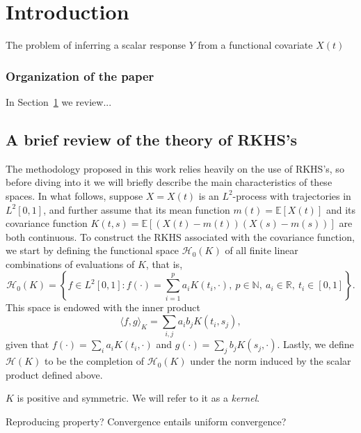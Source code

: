 \documentclass[ba]{imsart}
\numberwithin{equation}{section}
\theoremstyle{plain}
\newcommand{\N}{\mathbb{N}}
\newcommand{\R}{\mathbb{R}}
\newenvironment{comment}
{
\noindent \em \color{red}
}
{
\color{black}
}
\begin{document}
\section{Introduction}\label{sec:intro}

The problem of inferring a scalar response \(Y\) from a functional covariate \(X(t)\)

\subsubsection{Organization of the paper}

In Section~\ref{sec:intro} we review...

\subsection{A brief review of the theory of RKHS's}

The methodology proposed in this work relies heavily on the use of RKHS's, so before diving into it we will briefly describe the main characteristics of these spaces. In what follows, suppose \(X=X(t)\) is an \(L^2\)-process with trajectories in \(L^2[0,1]\), and further assume that its mean function \(m(t)=\mathbb E[X(t)]\) and its covariance function \(K(t, s)= \mathbb E[(X(t) - m(t))(X(s) - m(s))]\) are both continuous. To construct the RKHS associated with the covariance function, we start by defining the functional space \(\mathcal H_0(K)\) of all finite linear combinations of evaluations of \(K\), that is,
\[
\mathcal H_0(K) = \left\{ f \in L^2[0,1]: f(\cdot) = \sum_{i=1}^p a_i K(t_i, \cdot), \ p \in \N, \ a_i \in \R, \ t_i \in [0, 1] \right\}.
\]
This space is endowed with the inner product
\[
\langle f, g\rangle_K = \sum_{i, j} a_i b_j K(t_i, s_j),
\]
given that \(f(\cdot)=\sum_i a_i K(t_i, \cdot) \) and \(g(\cdot)=\sum_j b_j K(s_j, \cdot)\). Lastly, we define \(\mathcal H(K)\) to be the completion of \(\mathcal H_0(K)\) under the norm induced by the scalar product defined above.

\begin{comment}
  \(K\) is positive and symmetric. We will refer to it as a \textit{kernel}.
\end{comment}

\begin{comment}
  Reproducing property? Convergence entails uniform convergence?
\end{comment}
\end{document}
